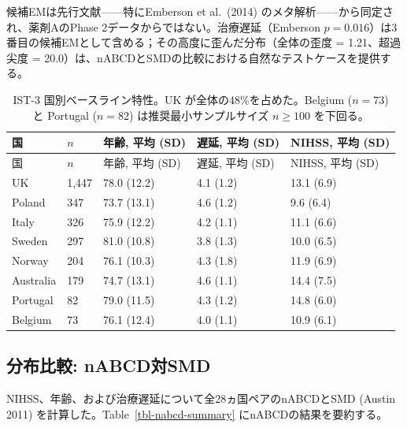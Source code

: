 \documentclass[
  a4paper,
  11pt]{ltjsarticle}
\begin{document}
候補EMは先行文献------特にEmberson et al.~(2014)
のメタ解析------から同定され、薬剤AのPhase
2データからではない。治療遅延（Emberson
\(p=0.016\)）は3番目の候補EMとして含める；その高度に歪んだ分布（全体の歪度
= 1.21、超過尖度 =
20.0）は、nABCDとSMDの比較における自然なテストケースを提供する。

\begin{longtable}[]{@{}lllll@{}}
\caption{IST-3 国別ベースライン特性。UK が全体の48\%を占めた。Belgium
(\(n=73\)) と Portugal (\(n=82\)) は推奨最小サンプルサイズ
\(n \geq 100\) を下回る。}\label{tbl-ist3-baseline}\tabularnewline
\toprule\noalign{}
国 & \(n\) & 年齢, 平均 (SD) & 遅延, 平均 (SD) & NIHSS, 平均 (SD) \\
\midrule\noalign{}
\endfirsthead
\toprule\noalign{}
国 & \(n\) & 年齢, 平均 (SD) & 遅延, 平均 (SD) & NIHSS, 平均 (SD) \\
\midrule\noalign{}
\endhead
\bottomrule\noalign{}
\endlastfoot
UK & 1,447 & 78.0 (12.2) & 4.1 (1.2) & 13.1 (6.9) \\
Poland & 347 & 73.7 (13.1) & 4.6 (1.2) & 9.6 (6.4) \\
Italy & 326 & 75.9 (12.2) & 4.2 (1.1) & 11.1 (6.6) \\
Sweden & 297 & 81.0 (10.8) & 3.8 (1.3) & 10.0 (6.5) \\
Norway & 204 & 76.1 (10.3) & 4.3 (1.8) & 11.9 (6.9) \\
Australia & 179 & 74.7 (13.1) & 4.6 (1.1) & 14.4 (7.5) \\
Portugal & 82 & 79.0 (11.5) & 4.3 (1.2) & 14.8 (6.0) \\
Belgium & 73 & 76.1 (12.4) & 4.0 (1.1) & 10.9 (6.1) \\
\end{longtable}

\subsection{分布比較:
nABCD対SMD}\label{ux5206ux5e03ux6bd4ux8f03-nabcdux5bfesmd}

NIHSS、年齢、および治療遅延について全28ヵ国ペアのnABCDとSMD (Austin
2011) を計算した。Table~\ref{tbl-nabcd-summary}
にnABCDの結果を要約する。
\end{document}

